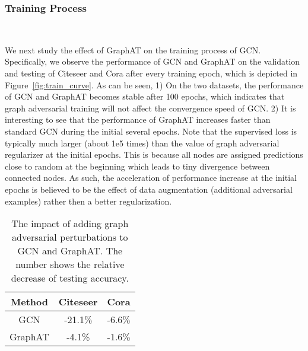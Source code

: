 \documentclass[10pt,journal,compsoc]{IEEEtran}
\begin{document}
\subsubsection{Training Process}
\begin{figure*}[]
	\centering
	\mbox{
		\hspace{-0.1in}
		\hspace{-0.15in}
		\hspace{-0.15in}
		\hspace{-0.15in}
	}
	\vspace{-0.2cm}
	\caption{Training curves of the GCN and GraphAT on the validation and testing of Citeseer and Cora.
	}
	\label{fig:train_curve}
\end{figure*}
We next study the effect of GraphAT on the training process of GCN. Specifically, we observe the performance of GCN and GraphAT on the validation and testing of Citeseer and Cora after every training epoch, which is depicted in Figure~\ref{fig:train_curve}. 
As can be seen, 1) On the two datasets, the performance of GCN and GraphAT becomes stable after 100 epochs, which indicates that graph adversarial training will not affect the convergence speed of GCN. 2) It is interesting to see that the performance of GraphAT increases faster than standard GCN during the initial several epochs. Note that the supervised loss is typically much larger (about 1e5 times) than the value of graph adversarial regularizer at the initial epochs. This is because all nodes are assigned predictions close to random at the beginning which leads to tiny divergence between connected nodes. As such, the acceleration of performance increase at the initial epochs is believed to be the effect of data augmentation (additional adversarial examples) rather then a better regularization.

\begin{table}[]
	\centering
	\vspace{-0.2cm}
	\caption{The impact of adding graph adversarial perturbations to GCN and GraphAT. The number shows the relative decrease of testing accuracy.}
	\vspace{-0.3cm}
	\label{tab:adv_perf}
\begin{tabular}{c|cc}
		\hline
		Method & Citeseer & Cora \\ \hline \hline
		GCN & -21.1\% & -6.6\% \\
		GraphAT & -4.1\% & -1.6\% \\ \hline
\end{tabular}\end{table}
\end{document}
